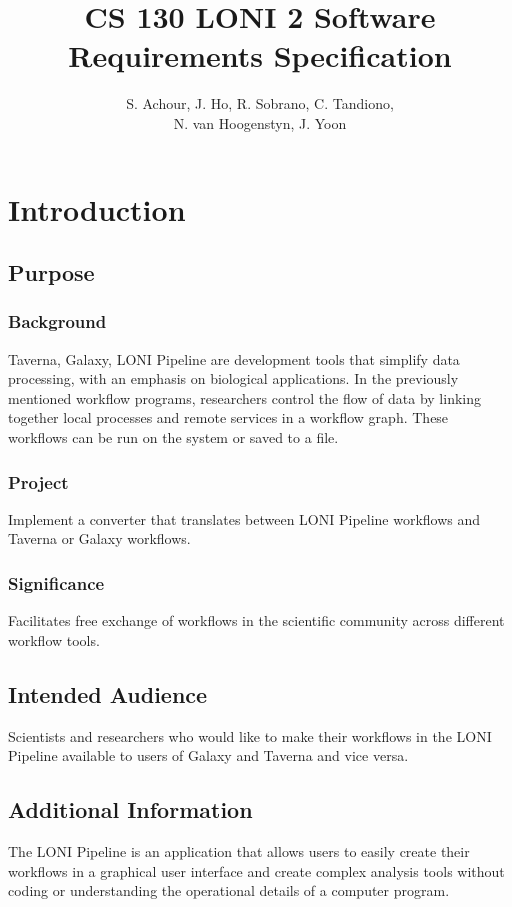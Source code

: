 \documentclass[12pt]{article}
\title{CS 130 LONI 2 Software Requirements Specification}
\author{S. Achour, J. Ho, R. Sobrano, C. Tandiono,\\ N. van Hoogenstyn, J. Yoon}
\begin{document}
\maketitle
\tableofcontents

\section{Introduction}
\subsection{Purpose}
\subsubsection{Background} Taverna, Galaxy, LONI Pipeline are development tools that simplify data processing, with an emphasis on biological applications. In the previously mentioned workflow programs, researchers control the flow of data by linking together local processes and remote services in a workflow graph. These workflows can be run on the system or saved to a file.
\subsubsection{Project} Implement a converter that translates between LONI Pipeline workflows and Taverna or Galaxy workflows.
\subsubsection{Significance} Facilitates free exchange of workflows in the scientific community across different workflow tools.


\subsection{Intended Audience}
Scientists and researchers who would like to make their workflows in the LONI Pipeline available to users of Galaxy and Taverna and vice versa.


\subsection{Additional Information}


The LONI Pipeline is an application that allows users to easily create their workflows in a graphical user interface and create complex analysis tools without coding or understanding the operational details of a computer program.
\end{document}
